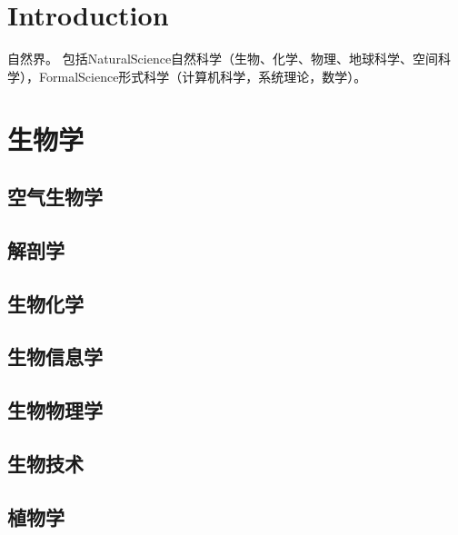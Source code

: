 

\chapter{Introduction}

自然界。
包括NaturalScience自然科学（生物、化学、物理、地球科学、空间科学），FormalScience形式科学（计算机科学，系统理论，数学）。




\chapter{生物学}    %


\section{空气生物学}
\section{解剖学}
\section{生物化学}
\section{生物信息学}
\section{生物物理学}
\section{生物技术}
\section{植物学}
